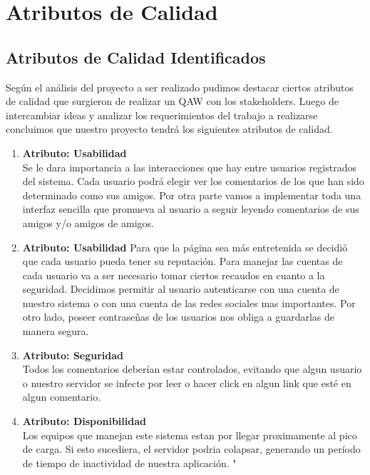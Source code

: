 \section{Atributos de Calidad}

\subsection{Atributos de Calidad Identificados}

\begin{spacing}{1.5}
Según el análisis del proyecto a ser realizado pudimos destacar ciertos atributos de calidad que surgieron de realizar un QAW con los stakeholders. Luego de intercambiar ideas y analizar los requerimientos del trabajo a realizarse concluimos que nuestro proyecto tendrá los siguientes atributos de calidad.
\end{spacing}

\begin{enumerate}
\item {\bf Atributo: Usabilidad}\\
Se le dara importancia a las interacciones que hay entre usuarios registrados del sistema. Cada usuario podrá elegir ver los comentarios de los que han sido determinado como sus amigos. Por otra parte vamos a implementar toda una interfaz sencilla que promueva al usuario a seguir leyendo comentarios de sus amigos y/o amigos de amigos.

\item {\bf Atributo: Usabilidad}
Para que la página sea más entretenida se decidió que cada usuario pueda tener su reputación. Para manejar las cuentas de cada usuario va a ser necesario tomar ciertos recaudos en cuanto a la seguridad. 
Decidimos permitir al usuario autenticarse con una cuenta de nuestro sistema o con una cuenta de las redes sociales mas importantes. Por otro lado, poseer contraseñas de los usuarios nos obliga a guardarlas de manera segura.

\item {\bf Atributo: Seguridad} \\
Todos los comentarios deberían estar controlados, evitando que algun usuario o nuestro servidor se infecte por leer o hacer click en algun link que esté en algun comentario.

\item {\bf Atributo: Disponibilidad}\\
Los equipos que manejan este sistema estan por llegar proximamente al pico de carga. Si esto sucediera, el servidor podria colapsar, generando un período de tiempo de inactividad de nuestra aplicación.
"
\end{enumerate}

